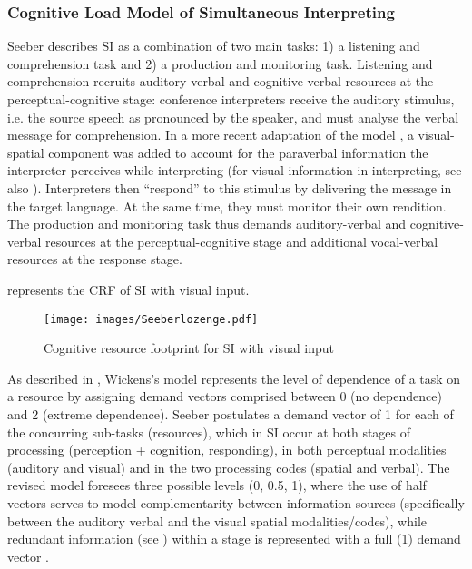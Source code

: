 \subsubsection{Cognitive Load Model of Simultaneous Interpreting} \label{CLM_standard}
\flushbottom
Seeber describes SI as a combination of two main tasks: 1) a listening and comprehension task and 2) a production and monitoring task. Listening and comprehension recruits auditory-verbal and cognitive-verbal resources at the perceptual-cognitive stage: conference interpreters receive the auditory stimulus, i.e. the source speech as pronounced by the speaker, and must analyse the verbal message for comprehension. In a more recent adaptation of the model \citep{seeber_multimodal_2017}, a visual-spatial component was added to account for the paraverbal information the interpreter perceives while interpreting (for visual information in interpreting, see also \citealt{seubert_visuelle_2019}). Interpreters then ``respond'' to this stimulus by delivering the message in the target language. At the same time, they must monitor their own rendition. The production and monitoring task thus demands auditory-verbal and cognitive-verbal resources at the perceptual-cognitive stage and additional vocal-verbal resources at the response stage.

 represents the CRF of SI with visual input.

\begin{figure}
\texttt{[image: images/Seeberlozenge.pdf]}
\caption[Cognitive resource footprint for SI with visual input]{Cognitive resource footprint for SI with visual input \citep[468]{seeber_multimodal_2017}\label{fig:CRF_SI}}
\end{figure}

As described in , Wickens's model represents the level of dependence of a task on a resource by assigning demand vectors comprised between 0 (no dependence) and 2 (extreme dependence). Seeber postulates a demand vector of 1 for each of the concurring sub-tasks (resources), which in SI occur at both stages of processing (perception + cognition, responding), in both perceptual modalities (auditory and visual) and in the two processing codes (spatial and verbal). The revised model foresees three possible levels (0, 0.5, 1), where the use of half vectors serves to model complementarity between information sources (specifically between the auditory verbal and the visual spatial modalities/codes), while redundant information (see ) within a stage is represented with a full (1) demand vector \citep[481]{seeber_multimodal_2017}.

